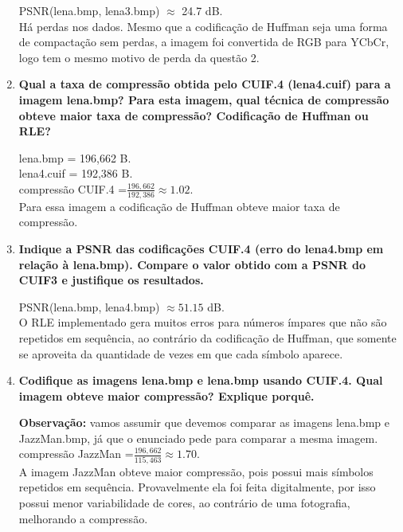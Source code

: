 \documentclass[12pt, a4paper, oneside]{abntex2}
\begin{document}
\begin{enumerate}
        PSNR(lena.bmp, lena3.bmp) $\approx$ 24.7 dB. \\
        Há perdas nos dados.
        Mesmo que a codificação de Huffman seja uma forma de compactação sem perdas, a imagem foi convertida de RGB para YCbCr, logo tem o mesmo motivo de perda da questão 2.

        \item \textbf{Qual a taxa de compressão obtida pelo CUIF.4 (lena4.cuif) para a imagem lena.bmp?
        Para esta imagem, qual técnica de compressão obteve maior taxa de compressão?
        Codificação de Huffman ou RLE?}

        lena.bmp = 196,662 B. \\
        lena4.cuif = 192,386 B. \\
        compressão CUIF.4 =$\frac{196,662}{192,386} \approx 1.02$. \\
        Para essa imagem a codificação de Huffman obteve maior taxa de compressão.

        \item \textbf{Indique a PSNR das codificações CUIF.4 (erro do lena4.bmp em relação à lena.bmp). Compare o valor obtido com a PSNR do CUIF3 e justifique os resultados.}

        PSNR(lena.bmp, lena4.bmp) $\approx 51.15$ dB. \\
        O RLE implementado gera muitos erros para números ímpares que não são repetidos em sequência, ao contrário da codificação de Huffman, que somente se aproveita da quantidade de vezes em que cada símbolo aparece.

        \item \textbf{Codifique as imagens lena.bmp e lena.bmp usando CUIF.4. Qual imagem obteve maior compressão?
        Explique porquê.}

        \textbf{Observação:} vamos assumir que devemos comparar as imagens lena.bmp e JazzMan.bmp, já que o enunciado pede para comparar a mesma imagem. \\
        compressão JazzMan =$\frac{196,662}{115,463} \approx 1.70$. \\
        A imagem JazzMan obteve maior compressão, pois possui mais símbolos repetidos em sequência.
        Provavelmente ela foi feita digitalmente, por isso possui menor variabilidade de cores, ao contrário de uma fotografia, melhorando a compressão.
    \end{enumerate}
\end{document}
